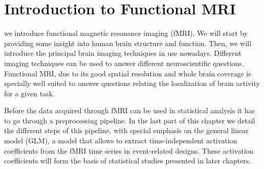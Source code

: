 

\chapter{Introduction to Functional MRI}\label{chap:intro_fmri}

\label{Chapter_1}



\vspace*{\fill}
 we introduce functional magnetic resonance imaging (fMRI). We will start by providing some insight into human brain structure and function. Then, we will introduce the principal brain imaging techniques in use nowadays. Different imaging techniques can be used to answer different neuroscientific questions. Functional MRI, due to its good spatial resolution and whole brain coverage is specially well suited to answer questions relating the localization of brain activity for a given task.

Before the data acquired through fMRI can be used in statistical analysis it has to go through a  preprocessing pipeline. In the last part of this chapter we detail the different steps of this pipeline, with special emphasis on the general linear model (GLM), a model that allows to extract time-independent activation coefficients from the fMRI time series in event-related designs.  These activation coefficients will form the basis of statistical studies presented in later chapters. 





\hspace{20pt}
\minitoc
\vspace*{\fill}

